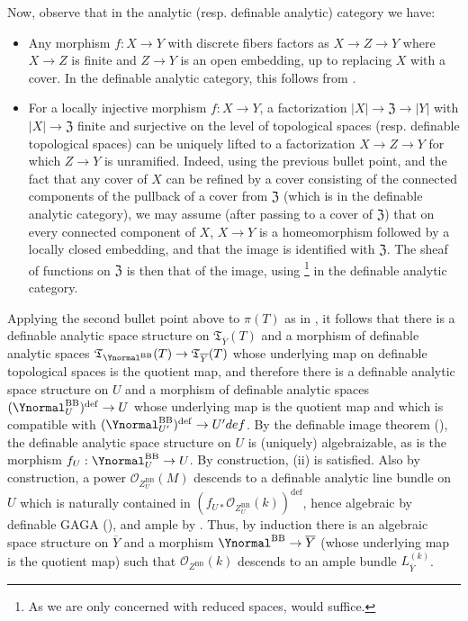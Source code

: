 \documentclass{amsart}
\newcommand{\ol}{\overline}
\theoremstyle{definition}
\theoremstyle{remark}
\def\cO{\mathcal{O}}
\def\fT{\mathfrak{T}}
\def\define{\mathrm{def}}
\def\BB{\mathrm{BB}}
\def\fT{\mathfrak{T}}
\renewcommand{\bar}[1]{\ol{#1}}
\numberwithin{equation}{section}
\begin{document}
Now, observe that in the analytic (resp. definable analytic) category we have: 
\begin{itemize}
\item Any morphism $f:X\to Y$ with discrete fibers factors as $X\to Z\to Y$ where $X\to Z$ is finite and $Z\to Y$ is an open embedding, up to replacing $X$ with a cover.  In the definable analytic category, this follows from \cite[Lemma 2.8]{BBTshaf}.
\item For a locally injective morphism $f:X\to Y$, a factorization $|X|\to \mathfrak{Z}\to |Y|$ with $|X|\to \mathfrak{Z}$ finite and surjective on the level of topological spaces (resp. definable topological spaces) can be uniquely lifted to a factorization $X\to Z\to Y$ for which $Z\to Y$ is unramified.  Indeed, using the previous bullet point, and the fact that any cover of $X$ can be refined by a cover consisting of the connected components of the pullback of a cover from $\mathfrak{Z}$ (which is \cite[Proposition 2.4]{BBT23} in the definable analytic category), we may assume (after passing to a cover of $\mathfrak{Z}$) that on every connected component of $X$, $X\to Y$ is a homeomorphism followed by a locally closed embedding, and that the image is identified with $\mathfrak{Z}$.  The sheaf of functions on $\mathfrak{Z}$ is then that of the image, using \cite[Proposition 2.52]{BBT23}\footnote{As we are only concerned with reduced spaces, \cite[Proposition 2.45]{BBT23} would suffice.} in the definable analytic category.

\end{itemize}
Applying the second bullet point above to $\pi(T)$ as in , it follows  that there is a definable analytic space structure on $\fT_{\bar Y}(T)$ and a morphism of definable analytic spaces $\fT_{\Ynormal^\BB}(T)\to \fT_{\bar Y}(T)$ whose underlying map on definable topological spaces is the quotient map, and therefore there is a definable analytic space structure on $U$ and a morphism of definable analytic spaces $(\Ynormal^\BB_U)^\define\to U$ whose underlying map is the quotient map and which is compatible with $(\Ynormal^\BB_{U'})^\define\to U'^\define$.  By the definable image theorem (), the definable analytic space structure on $U$ is (uniquely) algebraizable, as is the morphism $f_U:\Ynormal^\BB_U\to U$.  By construction, (ii) is satisfied.  Also by construction, a power $\cO_{Z^\BB_U}(M)$ descends to a definable analytic line bundle on $U$ which is naturally contained in $(f_{U*}\cO_{Z^\BB_U}(k))^\define$, hence algebraic by definable GAGA (), and ample by .  Thus, by induction there is an algebraic space structure on $\bar Y$ and a morphism $\Ynormal^\BB\to\bar Y$ (whose underlying map is the quotient map) such that $\cO_{Z^\BB}(k)$ descends to an ample bundle $L_{\bar Y}^{(k)}$.
\end{document}
